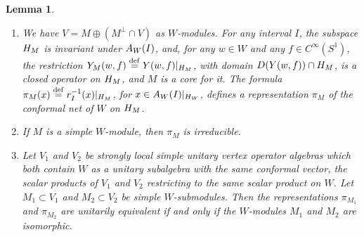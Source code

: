 \documentclass[leqno]{article}
\let\cal\relax
\newcommand{\cal}{\mathcal}
\newcommand{\ov}{\overset}
\newtheorem{lemma}[thm]{Lemma}
\numberwithin{equation}{section}
\begin{document}
\begin{lemma}
\label{lem:submodules}
\begin{enumerate}
\item We have $V = M \oplus (M^\perp \cap V)$ as $W$-modules. For any interval $I$, the subspace $\cal H_M$ is invariant under $\cal A_W(I)$, and, for any $w \in W$ and any $f \in C^\infty(S^1)$, the restriction $Y_M(w,f) \ov{\mathrm{def}}{=} Y(w,f)|_{\cal H_M}$, with domain $D(Y(w,f)) \cap \cal H_M$, is a closed operator on $\cal H_M$, and $M$ is a core for it. The formula $\pi_M(x) \ov{\mathrm{def}}{=} r_I^{-1}(x)|_{\cal H_M}$, for $x \in \cal A_W(I)|_{\cal H_W}$, defines a representation $\pi_M$ of the conformal net of $W$ on $\cal H_M$.
\item If $M$ is a simple $W$-module, then $\pi_M$ is irreducible.
\item Let $V_1$ and $V_2$ be strongly local simple unitary vertex operator algebras which both contain $W$ as a unitary subalgebra with the same conformal vector, the scalar products of $V_1$ and $V_2$ restricting to the same scalar product on $W$. Let $M_1 \subset V_1$ and $M_2 \subset V_2$ be simple $W$-submodules. Then the representations $\pi_{M_1}$ and $\pi_{M_2}$ are unitarily equivalent if and only if the $W$-modules $M_1$ and $M_2$ are isomorphic.
\end{enumerate}
\end{lemma}
\end{document}
